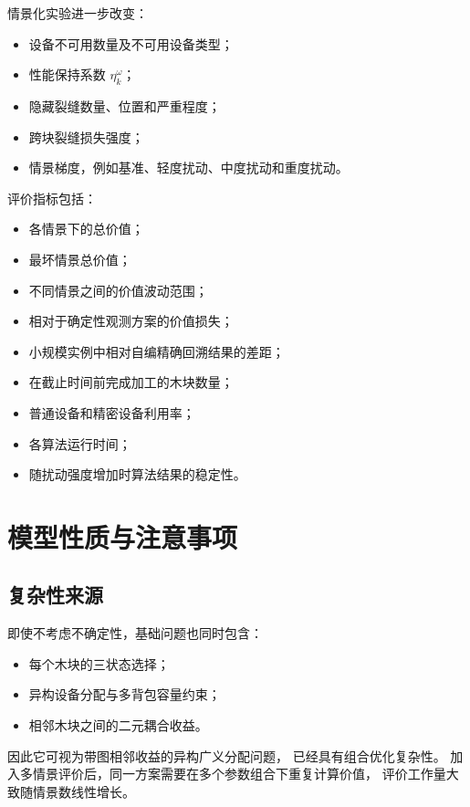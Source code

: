 ﻿\documentclass[UTF8,12pt,a4paper]{ctexart}
\begin{document}
\begin{description}[leftmargin=2em,labelsep=0.5em,itemsep=0.6em]
  \item[\textbf{扩展变量：}]
情景化实验进一步改变：

\begin{itemize}
  \item 设备不可用数量及不可用设备类型；
  \item 性能保持系数 \(\eta_k^\omega\)；
  \item 隐藏裂缝数量、位置和严重程度；
  \item 跨块裂缝损失强度；
  \item 情景梯度，例如基准、轻度扰动、中度扰动和重度扰动。
\end{itemize}

  \item[\textbf{评价指标：}]
评价指标包括：

\begin{itemize}
  \item 各情景下的总价值；
  \item 最坏情景总价值；
  \item 不同情景之间的价值波动范围；
  \item 相对于确定性观测方案的价值损失；
  \item 小规模实例中相对自编精确回溯结果的差距；
  \item 在截止时间前完成加工的木块数量；
  \item 普通设备和精密设备利用率；
  \item 各算法运行时间；
  \item 随扰动强度增加时算法结果的稳定性。
\end{itemize}
\end{description}

\section{模型性质与注意事项}

\subsection{复杂性来源}

\begin{description}[leftmargin=2em,labelsep=0.5em,itemsep=0.6em]
  \item[\textbf{组合复杂性：}]
即使不考虑不确定性，基础问题也同时包含：

\begin{itemize}
  \item 每个木块的三状态选择；
  \item 异构设备分配与多背包容量约束；
  \item 相邻木块之间的二元耦合收益。
\end{itemize}

因此它可视为带图相邻收益的异构广义分配问题，
已经具有组合优化复杂性。
加入多情景评价后，同一方案需要在多个参数组合下重复计算价值，
评价工作量大致随情景数线性增长。
\end{description}
\end{document}
